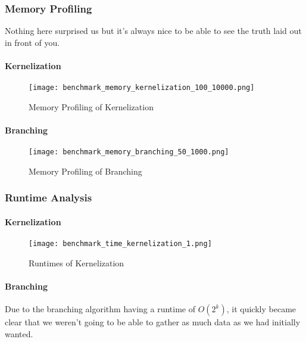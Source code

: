 \subsubsection{Memory Profiling}

Nothing here surprised us but it's always nice to be able to see the
truth laid out in front of you.

\paragraph{Kernelization}

\begin{figure}[H]
    \centering
    \texttt{[image: benchmark\_memory\_kernelization\_100\_10000.png]}
    \caption{Memory Profiling of Kernelization}
    \label{fig:benchmark_mem_kernelization}
\end{figure}

\paragraph{Branching}

\begin{figure}[H]
    \centering
    \texttt{[image: benchmark\_memory\_branching\_50\_1000.png]}
    \caption{Memory Profiling of Branching}
    \label{fig:benchmark_mem_branching}
\end{figure}

\subsubsection{Runtime Analysis}

\paragraph{Kernelization}

\begin{figure}[H]
    \centering
    \texttt{[image: benchmark\_time\_kernelization\_1.png]}
    \caption{Runtimes of Kernelization}
    \label{fig:benchmark_time_kernelization}
\end{figure}

\paragraph{Branching}

Due to the branching algorithm having a runtime of \(O(2^k)\), it
quickly became clear that we weren't going to be able to gather as much
data as we had initially wanted.

